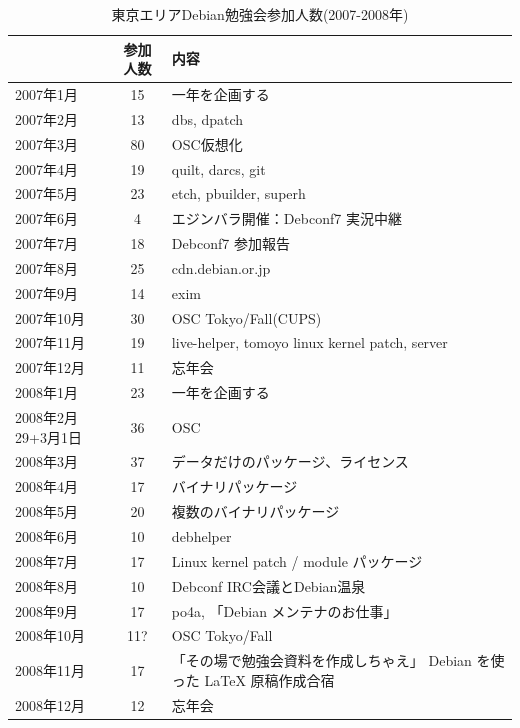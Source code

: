 \documentclass[mingoth,a4paper]{jsarticle}
\begin{document}
\begin{table}[h]
\begin{minipage}{0.5\hsize}
 \caption{東京エリアDebian勉強会参加人数(2007-2008年)}\label{tab:count2007}
 \begin{center}
  \begin{tabular}{|l|c|p{10em}|}
 \hline
 & 参加人数 & 内容\\
 \hline
   2007年1月 & 15 & 一年を企画する \\
   2007年2月 & 13 & dbs, dpatch\\ 
   2007年3月 & 80 & OSC仮想化 \\
   2007年4月 & 19 & quilt, darcs, git\\
   2007年5月 & 23 & etch, pbuilder, superh \\   
   2007年6月 & 4 & エジンバラ開催：Debconf7 実況中継 \\
   2007年7月 & 18 & Debconf7 参加報告\\
   2007年8月 & 25 & cdn.debian.or.jp \\   
   2007年9月 & 14 & exim \\   
   2007年10月 & 30 & OSC Tokyo/Fall(CUPS) \\   
   2007年11月 & 19 & live-helper, tomoyo linux kernel patch, server\\
   2007年12月 & 11 & 忘年会\\
   2008年1月 & 23 & 一年を企画する \\
   2008年2月29+3月1日 & 36 & OSC  \\
   2008年3月 & 37 & データだけのパッケージ、ライセンス \\
   2008年4月 & 17 & バイナリパッケージ \\
   2008年5月 & 20 & 複数のバイナリパッケージ \\
   2008年6月 & 10 & debhelper \\
   2008年7月 & 17 & Linux kernel patch / module パッケージ \\
   2008年8月 & 10 & Debconf IRC会議とDebian温泉 \\
   2008年9月 & 17 & po4a, 「Debian メンテナのお仕事」 \\
   2008年10月 & 11? & OSC Tokyo/Fall \\
   2008年11月 & 17 & 「その場で勉強会資料を作成しちゃえ」 Debian を使った \LaTeX{} 原稿作成合宿 \\
   2008年12月 & 12 & 忘年会 \\
 \hline
  \end{tabular}
 \end{center}
\end{minipage}
\end{table}
\end{document}
